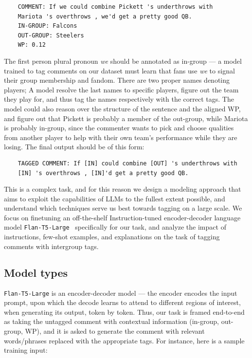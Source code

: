\begin{verbatim}
    COMMENT: If we could combine Pickett 's underthrows with
    Mariota 's overthrows , we'd get a pretty good QB.
    IN-GROUP: Falcons
    OUT-GROUP: Steelers
    WP: 0.12
\end{verbatim}

The first person plural pronoun \emph{we} should be annotated as in-group --- a model trained to tag comments on our dataset must learn that fans use \emph{we} to signal their group membership and fandom. There are two proper names denoting players; A model resolve the last names to specific players, figure out the team they play for, and thus tag the names respectively with the correct tags. The model could also reason over the structure of the sentence and the aligned WP, and figure out that Pickett is probably a member of the out-group, while Mariota is probably in-group, since the commenter wants to pick and choose qualities from another player to help with their own team's performance while they are losing. The final output should be of this form:

\begin{verbatim}
    TAGGED COMMENT: If [IN] could combine [OUT] 's underthrows with 
    [IN] 's overthrows , [IN]'d get a pretty good QB.
\end{verbatim}

This is a complex task, and for this reason we design a modeling approach that aims to exploit the capabilities of LLMs to the fullest extent possible, and understand which techniques serve us best towards tagging on a large scale. We focus on finetuning an off-the-shelf Instruction-tuned encoder-decoder language model \texttt{Flan-T5-Large}~\citep{Chung2022ScalingIL} specifically for our task, and analyze the impact of instructions, few-shot examples, and explanations on the task of tagging comments with intergroup tags.

\subsection{Model types}

\texttt{Flan-T5-Large} is an encoder-decoder model --- the encoder encodes the input prompt, upon which the decode learns to attend to different regions of interest, when generating its output, token by token. Thus, our task is framed end-to-end as taking the untagged comment with contextual information (in-group, out-group, WP), and it is asked to generate the comment with relevant words/phrases replaced with the appropriate tags. For instance, here is a sample training input:

